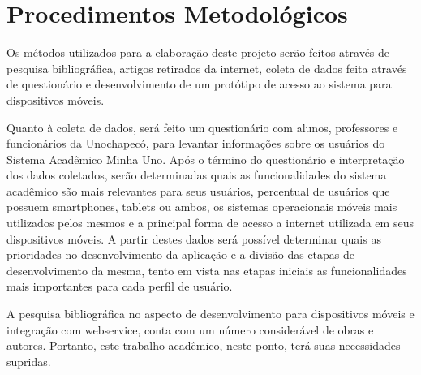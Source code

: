 \chapter{Procedimentos Metodológicos}

Os métodos utilizados para a elaboração deste projeto serão feitos através de pesquisa bibliográfica, artigos retirados da internet, coleta de dados feita através de questionário e desenvolvimento de um protótipo de acesso ao sistema para dispositivos móveis.

Quanto à coleta de dados, será feito um questionário com alunos, professores e funcionários da Unochapecó, para levantar informações sobre os usuários do Sistema Acadêmico Minha Uno.  Após o término do questionário e interpretação dos dados coletados, serão determinadas quais as funcionalidades do sistema acadêmico são mais relevantes para seus usuários, percentual de usuários que possuem smartphones, tablets ou ambos, os sistemas operacionais móveis mais utilizados pelos mesmos e a principal forma de acesso a internet utilizada em seus dispositivos móveis. A partir destes dados será possível determinar quais as prioridades no desenvolvimento da aplicação e a divisão das etapas de desenvolvimento da mesma, tento em vista nas etapas iniciais as funcionalidades mais importantes para cada perfil de usuário.

A pesquisa bibliográfica no aspecto de desenvolvimento para dispositivos móveis e integração com webservice, conta com um número considerável de obras e autores. Portanto, este trabalho acadêmico, neste ponto, terá suas necessidades supridas.



